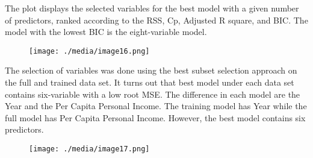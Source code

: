 \documentclass[12pt]{article}
\begin{document}
\begin{justify}
The plot displays the selected variables for the best model with a given number of predictors, ranked according to the RSS, Cp, Adjusted R square, and BIC. The model with the lowest BIC is the eight-variable model.
\end{justify}\par




\begin{figure}[H]
	\begin{Center}
		\texttt{[image: ./media/image16.png]}
	\end{Center}
\end{figure}



\par


\vspace{\baselineskip}
\begin{justify}
The selection of variables was done using the best subset selection approach on the full and trained data set. It turns out that best model under each data set contains six-variable with a low root MSE. The difference in each model are the Year and the Per Capita Personal Income. The training model has Year while the full model has Per Capita Personal Income. However, the best model contains six predictors.
\end{justify}\par




\begin{figure}[H]
	\begin{Center}
		\texttt{[image: ./media/image17.png]}
	\end{Center}
\end{figure}



\par



\end{document}

